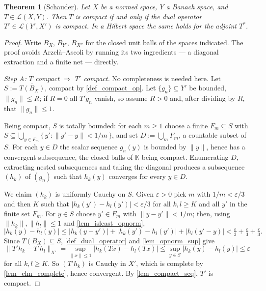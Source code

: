 \documentclass[a4paper]{report}
\theoremstyle{plain}
\newtheorem{theorem}{Theorem}[chapter]
\theoremstyle{definition}
\theoremstyle{remark}
\begin{document}
\begin{theorem}[Schauder]
  \label{thm_schauder}
  Let $X$ be a normed space, $Y$ a Banach space, and $T \in \mathcal{L}(X,Y)$.  Then $T$
  is compact if and only if the dual operator $T' \in \mathcal{L}(Y',X')$ is compact.  In
  a Hilbert space the same holds for the adjoint $T^*$.
\end{theorem}
\begin{proof}
  Write $B_X$, $B_{Y'}$, $B_{X''}$ for the closed unit balls of the spaces indicated.  The
  proof avoids Arzel\`a--Ascoli by running its two ingredients --- a diagonal extraction and
  a finite net --- directly.

  \emph{Step A: $T$ compact $\Rightarrow$ $T'$ compact.}  No completeness is needed here.
  Let $S := \overline{T(B_X)}$, compact by \cref{def_compact_op}.  Let
  $\{g_n\} \subseteq Y'$ be bounded, $\|g_n\| \le R$; if $R = 0$ all $T'g_n$ vanish, so
  assume $R > 0$ and, after dividing by $R$, that $\|g_n\| \le 1$.

  Being compact, $S$ is totally bounded: for each
  $m \ge 1$ choose a finite $F_m \subseteq S$ with
  $S \subseteq \bigcup_{y \in F_m}\{\,y' : \|y'-y\| < 1/m\,\}$, and set
  $D := \bigcup_m F_m$, a countable subset of $S$.  For each $y \in D$ the scalar sequence
  $g_n(y)$ is bounded by $\|y\|$, hence has a convergent subsequence, the closed balls of
  $\mathbb{K}$ being compact.  Enumerating $D$, extracting nested subsequences
  and taking the diagonal produces a subsequence $(h_k)$ of $(g_n)$ such that $h_k(y)$
  converges for every $y \in D$.

  We claim $(h_k)$ is uniformly Cauchy on $S$.  Given $\varepsilon > 0$ pick $m$ with
  $1/m < \varepsilon/3$ and then $K$ such that $|h_k(y')-h_l(y')| < \varepsilon/3$ for all
  $k,l \ge K$ and all $y'$ in the finite set $F_m$.  For $y \in S$ choose $y' \in F_m$ with
  $\|y-y'\| < 1/m$; then, using $\|h_k\|,\|h_l\| \le 1$ and \cref{lem_isleast_opnorm},
  \[
    |h_k(y)-h_l(y)| \le |h_k(y-y')| + |h_k(y')-h_l(y')| + |h_l(y'-y)|
      < \tfrac{\varepsilon}{3}+\tfrac{\varepsilon}{3}+\tfrac{\varepsilon}{3} .
  \]
  Since $T(B_X) \subseteq S$, \cref{def_dual_operator} and \cref{lem_opnorm_sup} give
  \[
    \|T'h_k - T'h_l\|_{X'} = \sup_{\|x\|\le 1}|h_k(Tx)-h_l(Tx)|
      \le \sup_{y \in S}|h_k(y)-h_l(y)| \le \varepsilon
  \]
  for all $k,l \ge K$.  So $(T'h_k)$ is Cauchy in $X'$, which is complete by
  \cref{lem_clm_complete}, hence convergent.  By \cref{lem_compact_seq}, $T'$ is compact.


\end{proof}
\end{document}
